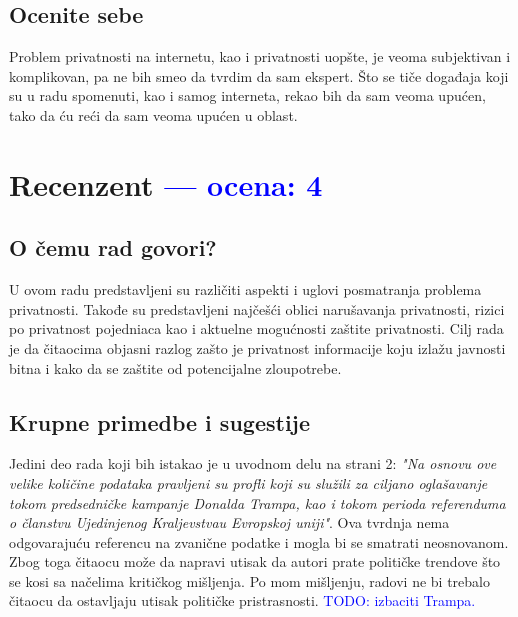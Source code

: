 \documentclass[a4paper]{report}
\newcommand{\odgovor}[1]{\textcolor{blue}{#1}}
\begin{document}
\section{Ocenite sebe}
Problem privatnosti na internetu, kao i privatnosti uopšte, je veoma subjektivan i komplikovan, pa ne bih smeo da tvrdim da sam ekspert. Što se tiče događaja koji su u radu spomenuti, kao i samog interneta, rekao bih da sam veoma upućen, tako da ću reći da sam veoma upućen u oblast.


\chapter{Recenzent \odgovor{--- ocena: 4} }


\section{O čemu rad govori?}

U ovom radu predstavljeni su različiti aspekti i uglovi posmatranja problema privatnosti. Takođe su predstavljeni najčešći oblici narušavanja privatnosti, rizici po privatnost pojedniaca kao i aktuelne mogućnosti zaštite privatnosti. Cilj rada je da čitaocima objasni razlog zašto je privatnost informacije koju izlažu javnosti bitna i kako da se zaštite od potencijalne zloupotrebe. 

\section{Krupne primedbe i sugestije}

Jedini deo rada koji bih istakao je u uvodnom delu na strani 2: \emph{"Na osnovu ove velike količine podataka pravljeni su profli koji su služili za ciljano oglašavanje tokom predsedničke kampanje Donalda Trampa, kao i tokom perioda referenduma o članstvu Ujedinjenog Kraljevstvau Evropskoj uniji"}. Ova tvrdnja nema odgovarajuću referencu na zvanične podatke i mogla bi se smatrati neosnovanom. Zbog toga čitaocu može da napravi utisak da autori prate političke trendove što se kosi sa načelima kritičkog mišljenja. Po mom mišljenju, radovi ne bi trebalo čitaocu da ostavljaju utisak političke pristrasnosti.
\odgovor{TODO: izbaciti Trampa.}
\end{document}
